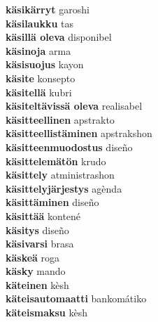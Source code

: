 \textbf{ käsikärryt  } garoshi \\
\textbf{ käsilaukku  } tas \\
\textbf{ käsillä oleva  } disponibel \\
\textbf{ käsinoja  } arma \\
\textbf{ käsisuojus  } kayon \\
\textbf{ käsite  } konsepto \\
\textbf{ käsitellä  } kubri \\
\textbf{ käsiteltävissä oleva  } realisabel \\
\textbf{ käsitteellinen  } apstrakto \\
\textbf{ käsitteellistäminen  } apstrakshon \\
\textbf{ käsitteenmuodostus  } diseño \\
\textbf{ käsittelemätön  } krudo \\
\textbf{ käsittely  } atministrashon \\
\textbf{ käsittelyjärjestys  } agènda \\
\textbf{ käsittäminen  } diseño \\
\textbf{ käsittää  } kontené \\
\textbf{ käsitys  } diseño \\
\textbf{ käsivarsi  } brasa \\
\textbf{ käskeä  } roga \\
\textbf{ käsky  } mando \\
\textbf{ käteinen  } kèsh \\
\textbf{ käteisautomaatti  } bankomátiko \\
\textbf{ käteismaksu  } kèsh \\
